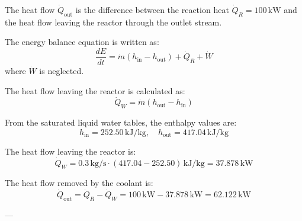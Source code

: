 The heat flow \( \dot{Q}_{\text{out}} \) is the difference between the reaction heat \( \dot{Q}_R = 100 \, \text{kW} \) and the heat flow leaving the reactor through the outlet stream.  

The energy balance equation is written as:  
\[
\frac{dE}{dt} = \dot{m} (h_{\text{in}} - h_{\text{out}}) + \dot{Q}_R + \dot{W}
\]  
where \( \dot{W} \) is neglected.  

The heat flow leaving the reactor is calculated as:  
\[
\dot{Q}_W = \dot{m} (h_{\text{out}} - h_{\text{in}})
\]  

From the saturated liquid water tables, the enthalpy values are:  
\[
h_{\text{in}} = 252.50 \, \text{kJ/kg}, \quad h_{\text{out}} = 417.04 \, \text{kJ/kg}
\]  

The heat flow leaving the reactor is:  
\[
\dot{Q}_W = 0.3 \, \text{kg/s} \cdot (417.04 - 252.50) \, \text{kJ/kg} = 37.878 \, \text{kW}
\]  

The heat flow removed by the coolant is:  
\[
\dot{Q}_{\text{out}} = \dot{Q}_R - \dot{Q}_W = 100 \, \text{kW} - 37.878 \, \text{kW} = 62.122 \, \text{kW}
\]  

---